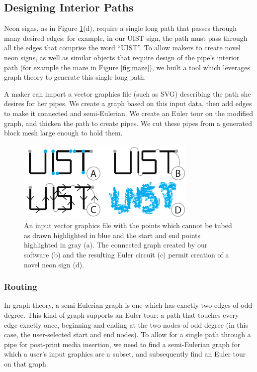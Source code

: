 \subsection{Designing Interior Paths}

Neon signs, as in Figure \ref{fig:tool-process-interior}(d), require a single long path that passes through many desired edges: for example, in our UIST sign, the path must pass through all the edges that comprise the word ``UIST''.  To allow makers to create novel neon signs, as well as similar objects that require design of the pipe's interior path (for example the maze in Figure \ref{fig:maze}), we built a tool which leverages graph theory to generate this single long path.

A maker can import a vector graphics file (such as SVG) describing the path she desires for her pipes.  We create a graph based on this input data, then add edges to make it connected and semi-Eulerian.  We create an Euler tour on the modified graph, and thicken the path to create pipes.    We cut these pipes from a generated block mesh large enough to hold them.

\begin{figure}[h!]
\centering
    \includegraphics[width=3.4in]{figures/interior.pdf}
\caption{An input vector graphics file with the points which cannot be tubed as drawn highlighted in {\color{blue}blue} and the start and end points highlighted in {\color{gray}gray} (a).  The connected graph created by our software (b) and the resulting Euler circuit (c) permit creation of a novel neon sign (d). }
\label{fig:tool-process-interior}
\end{figure}

\subsubsection{Routing}
In graph theory, a semi-Eulerian graph is one which has exactly two edges of odd degree.  This kind of graph supports an Euler tour: a path that touches every edge exactly once, beginning and ending at the two nodes of odd degree (in this case, the user-selected start and end nodes).  To allow for a single path through a pipe for post-print media insertion, we need to find a semi-Eulerian graph for which a user's input graphics are a subset, and subsequently find an Euler tour on that graph.

